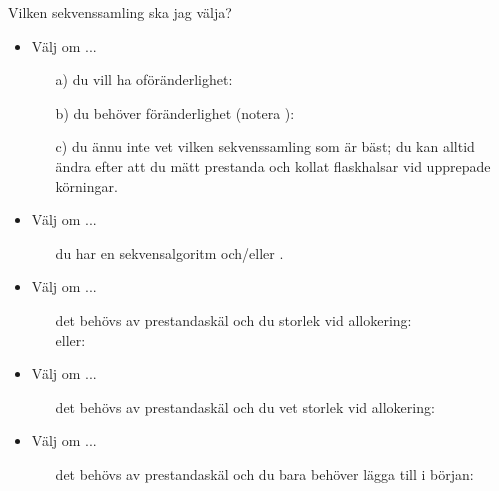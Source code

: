 \begin{Slide}{Vilken sekvenssamling ska jag välja?}\SlideFontSmall
\vspace{-0.5em}
\begin{itemize}
\item Välj  om ...
  \begin{itemize}\SlideFontTiny
  \item[a)] du vill ha oföränderlighet: 
  \item[b)] du behöver föränderlighet (notera ):\\ 
  \item[c)] du ännu inte vet vilken sekvenssamling som är bäst; du kan alltid ändra efter att du mätt prestanda och kollat flaskhalsar vid upprepade körningar.
  \end{itemize}

\item Välj  om ...
  \begin{itemize}\SlideFontTiny
  \item[] du har en  sekvensalgoritm och/eller .
  \end{itemize}


\item Välj  om ...
  \begin{itemize}\SlideFontTiny
  \item[] det behövs av prestandaskäl och du  storlek vid allokering:\\
    eller:
  \end{itemize}

\item Välj  om ...
  \begin{itemize}\SlideFontTiny
  \item[] det behövs av prestandaskäl och du  vet storlek vid allokering:\\
  \end{itemize}

\item Välj  om ...
  \begin{itemize}\SlideFontTiny
  \item[] det behövs av prestandaskäl och du bara behöver lägga till i början:\\ 
  \end{itemize}

\end{itemize}
\end{Slide}


